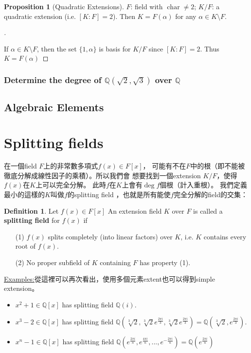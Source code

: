 \documentclass[12pt]{article}
\theoremstyle{definition}
\newcommand{\ex}{\noindent\underline{Examples:}}
\newtheorem{dfn}{Definition}
\newtheorem{prop}{Proposition}
\newenvironment{proofs}[1][\proofname]{%
  \begin{proof}[#1]$ $\par\nobreak\ignorespaces
}{%
  \end{proof}
}
\newcommand{\QQ}{\mathbb Q}
\DeclareMathOperator{\Char}{char}
\begin{document}
\begin{prop}[Quadratic Extensions]
	$F$: field with $\Char\neq 2$; $K/F$: a quadratic extension (i.e. $[K:F]=2$). Then $K=F(\alpha)$ for any $\alpha \in K\setminus F$.
\end{prop}

\begin{proofs}
	If $\alpha\in K\setminus F$, then the set $\{1,\alpha\}$ is basis for $K/F$ since $[K:F]=2$. Thus $K=F(\alpha)$
\end{proofs}

\subsubsection*{Determine the degree of $\QQ(\sqrt{2},\sqrt{3})$ over $\QQ$}


\subsection{Algebraic Elements}

\section{Splitting fields}

在一個field $F$上的非常數多項式$f(x)\in F[x]$，
可能有不在$F$中的根（即不能被徹底分解成線性因子的乘積）。所以我們會
想要找到一個extension $K/F$，使得$f(x)$在$K$上可以完全分解。
此時$f$在$K$上會有$\deg f$個根（計入重根）。
我們定義最小的這樣的$K$叫做$f$的splitting field
，也就是所有能使$f$完全分解的field的交集：

\begin{dfn}
	Let $f(x) \in F[x]$ An extension field $K$ over $F$ is called a \textbf{splitting field} for $f(x)$ if
	\begin{enumerate}
		\item[(1)] $f(x)$ splits completely (into linear factors) over $K$, i.e. $K$ contains every root of $f(x)$.

		\item[(2)] No proper subfield of $K$ containing $F$ has property (1).
	\end{enumerate}
\end{dfn}

\ex 從這裡可以再次看出，使用多個元素extent也可以得到simple extension。

\begin{itemize}
	\item $x^2 + 1 \in \mathbb{Q}[x]$ has splitting field $\mathbb{Q}(i)$.

	\item $x^3 - 2 \in \mathbb{Q}[x]$ has splitting field $\mathbb{Q}(\sqrt[3]{2}, \sqrt[3]{2} e^{\frac{2 \pi i}{3}}, \sqrt[3]{2} e^{\frac{2 \pi i}{3}}) = \mathbb{Q}(\sqrt[3]{2}, e^{\frac{2 \pi i}{3}})$.

	\item $x^n - 1 \in \mathbb{Q}[x]$ has splitting field $\mathbb{Q}(e^{\frac{2 \pi i}{n}}, e^{\frac{4 \pi i}{n}}, ..., e^{-\frac{2 \pi i}{n}}) = \mathbb{Q}(e^{\frac{2 \pi i}{n}})$
\end{itemize}
\end{document}
